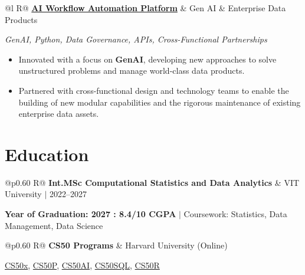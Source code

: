 \documentclass[a4paper,10pt]{article}
\newcommand{\ulink}[2]{\href{#1}{#2}}
\newcommand{\subheading}[1]{{\color[HTML]{0A0A0A}\fontsize{12}{14}\selectfont\bfseries #1}}
\newcommand{\techstack}[1]{{\color[HTML]{5C5C5C}\fontsize{10.5}{12.5}\selectfont\itshape #1}}
\newcommand{\meta}[1]{{\color[HTML]{5C5C5C}\fontsize{10.5}{12.5}\selectfont #1}}
\begin{document}
\begin{tabularx}{\linewidth}{@{}l R@{}}
\subheading{\ulink{https://github.com/su-jin1425/AI-Workflow-Automation-Platform}{AI Workflow Automation Platform}} & \meta{Gen AI \& Enterprise Data Products}
\end{tabularx}
\techstack{GenAI, Python, Data Governance, APIs, Cross-Functional Partnerships}
\begin{itemize}[nosep, leftmargin=1.5em, itemsep=2pt, topsep=2pt]
  \item {\color[HTML]{0A0A0A}\fontsize{11}{14}\selectfont Innovated with a focus on \textbf{GenAI}, developing new approaches to solve unstructured problems and manage world-class data products.}
  \item {\color[HTML]{0A0A0A}\fontsize{11}{14}\selectfont Partnered with cross-functional design and technology teams to enable the building of new modular capabilities and the rigorous maintenance of existing enterprise data assets.}
\end{itemize}

\section{Education}
\vspace{2pt}

\begin{tabularx}{\linewidth}{@{}p{0.60\linewidth} R@{}}
\subheading{Int.MSc Computational Statistics and Data Analytics} & \meta{VIT University $|$ 2022--2027}
\end{tabularx}
{\color[HTML]{3A3A3A}\fontsize{11}{14}\selectfont \textbf{Year of Graduation: 2027 : 8.4/10 CGPA} $|$ Coursework: Statistics, Data Management, Data Science}

\begin{tabularx}{\linewidth}{@{}p{0.60\linewidth} R@{}}
\subheading{CS50 Programs} & \meta{Harvard University (Online)}
\end{tabularx}
{\color[HTML]{3A3A3A}\fontsize{11}{14}\selectfont \ulink{https://cs50.harvard.edu/certificates/b14b78df-e05c-413e-a607-1dd27303053a}{CS50x}, \ulink{https://cs50.harvard.edu/certificates/32477052-9db4-49c4-a5a4-d7e58429ca2c}{CS50P}, \ulink{https://cs50.harvard.edu/certificates/9cdb4d4a-1250-4f8e-9fd7-191864e0f919}{CS50AI}, \ulink{https://cs50.harvard.edu/certificates/bc486f24-f085-4e61-8536-80940b97a1b9}{CS50SQL}, \ulink{https://cs50.harvard.edu/certificates/666838e6-a053-4d82-b179-a60fe745fd84}{CS50R}}

\end{document}
